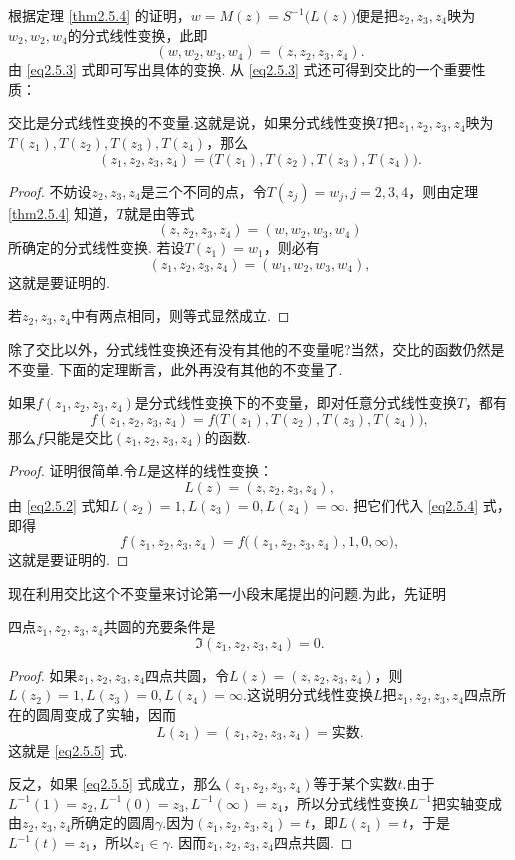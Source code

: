 根据定理 \ref{thm2.5.4} 的证明，$w=M(z)=S^{-1}\big(L(z)\big)$便是把$z_2,z_3,z_4$映为$w_2,w_2,w_4$的分式线性变换，此即
\begin{equation}\label{eq2.5.3}
  (w,w_2,w_3,w_4) =( z,z_2,z_3,z_4).
\end{equation}
由 \eqref{eq2.5.3} 式即可写出具体的变换. 从 \eqref{eq2.5.3} 式还可得到交比的一个重要性质：
\begin{theorem}\label{thm2.5.5}
  交比是分式线性变换的不变量.这就是说，如果分式线性变换$T$把$z_1,z_2,z_3,z_4$映为$T(z_1),T(z_2),T(z_3),T(z_4)$，那么
  \[
    (z_1,z_2,z_3,z_4) = \big(T(z_1),T(z_2),T(z_3),T(z_4)\big).
  \]
\end{theorem}
\begin{proof}
  不妨设$z_2,z_3,z_4$是三个不同的点，令$T(z_j)=w_j,j=2,3,4$，则由定理 \ref{thm2.5.4} 知道，$T$就是由等式
  \[
    (z,z_2,z_3,z_4) = (w,w_2,w_3,w_4)
  \]
  所确定的分式线性变换. 若设$T(z_1)=w_1$，则必有
  \[
    (z_1,z_2,z_3,z_4) = (w_1,w_2,w_3,w_4),
  \]
  这就是要证明的.

  若$z_2,z_3,z_4$中有两点相同，则等式显然成立.
\end{proof}

除了交比以外，分式线性变换还有没有其他的不变量呢?当然，交比的函数仍然是不变量. 下面的定理断言，此外再没有其他的不变量了.
\begin{theorem}\label{thm2.5.6}
  如果$f(z_1,z_2,z_3,z_4)$是分式线性变换下的不变量，即对任意分式线性变换$T$，都有
  \begin{equation}\label{eq2.5.4}
    f(z_1,z_2,z_3,z_4) = f\big(T(z_1),T(z_2),T(z_3),T(z_4)\big),
  \end{equation}
  那么$f$只能是交比$(z_1,z_2,z_3,z_4)$的函数.
\end{theorem}
\begin{proof}
  证明很简单.令$L$是这样的线性变换：
  \[
  L(z) = (z,z_2,z_3,z_4),
  \]
  由 \eqref{eq2.5.2} 式知$L(z_2)=1,L(z_3)=0,L(z_4)=\infty$. 把它们代入 \eqref{eq2.5.4} 式，即得
  \[
    f(z_1,z_2,z_3,z_4) = f\big((z_1,z_2,z_3,z_4),1,0,\infty\big),
  \]
  这就是要证明的.
\end{proof}

现在利用交比这个不变量来讨论第一小段末尾提出的问题.为此，先证明
\begin{prop}\label{prop2.5.7}
  四点$z_1,z_2,z_3,z_4$共圆的充要条件是
  \begin{equation}\label{eq2.5.5}
    \Im(z_1,z_2,z_3,z_4) = 0.
  \end{equation}
\end{prop}
\begin{proof}
  如果$z_1,z_2,z_3,z_4$四点共圆，令$L(z)=(z,z_2,z_3,z_4)$，则$L(z_2)=1,L(z_3)=0,L(z_4)=\infty$.这说明分式线性变换$L$把$z_1,z_2,z_3,z_4$四点所在的圆周变成了实轴，因而
  \[
    L(z_1)=(z_1,z_2,z_3,z_4) = \text{实数}.
  \]
  这就是 \eqref{eq2.5.5} 式.

  反之，如果 \eqref{eq2.5.5} 式成立，那么$(z_1,z_2,z_3,z_4)$等于某个实数$t$.由于$L^{-1}(1)=z_2,L^{-1}(0)=z_3,L^{-1}(\infty)=z_4$，所以分式线性变换$L^{-1}$把实轴变成由$z_2,z_3,z_4$所确定的圆周$\gamma$.因为$(z_1,z_2,z_3,z_4)=t$，即$L(z_1)=t$，于是$L^{-1}(t)=z_1$，所以$z_1\in\gamma$. 因而$z_1,z_2,z_3,z_4$四点共圆.
\end{proof}

